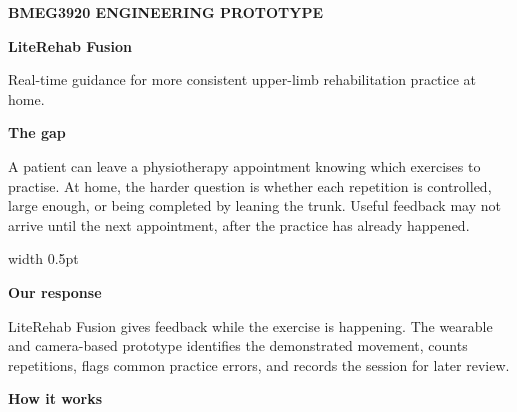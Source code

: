 \documentclass[10pt,a4paper]{article}
\newcommand{\sectiontitle}[1]{%
  {\color{PitchTeal}\bfseries\fontsize{12.2}{13.2}\selectfont #1}\par
  \vspace{1.3pt}{\color{PitchRule}\rule{\linewidth}{0.45pt}}\vspace{2.2pt}%
}
\begin{document}
\fontsize{9.2}{11.0}\selectfont
\raggedright

\colorbox{PitchNavy}{%
  \parbox{\dimexpr\linewidth-2\fboxsep\relax}{%
    \vspace{3.2mm}
    {\color{white}\bfseries\fontsize{8.3}{9.2}\selectfont\MakeUppercase{BMEG3920 Engineering Prototype}}\par
    \vspace{1.2mm}
    {\color{white}\bfseries\fontsize{27}{29}\selectfont LiteRehab Fusion}\par
    \vspace{1.2mm}
    {\color{white}\fontsize{12.4}{14.2}\selectfont Real-time guidance for more consistent upper-limb rehabilitation practice at home.}\par
    \vspace{3.2mm}
  }%
}

\vspace{4.2mm}

\begin{minipage}[t]{0.485\linewidth}
  \vspace{0pt}\raggedright
  \sectiontitle{The gap}
  A patient can leave a physiotherapy appointment knowing which exercises to practise. At home, the harder question is whether each repetition is controlled, large enough, or being completed by leaning the trunk. Useful feedback may not arrive until the next appointment, after the practice has already happened.
\end{minipage}\hfill
{\color{PitchRule}\vrule width 0.5pt}\hfill
\begin{minipage}[t]{0.485\linewidth}
  \vspace{0pt}\raggedright
  \sectiontitle{Our response}
  LiteRehab Fusion gives feedback while the exercise is happening. The wearable and camera-based prototype identifies the demonstrated movement, counts repetitions, flags common practice errors, and records the session for later review.
\end{minipage}

\vspace{4.0mm}
\sectiontitle{How it works}
\end{document}
